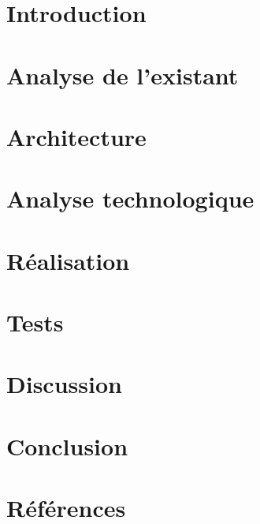 \documentclass[a4paper, 12pt]{article}
\begin{document}
\section{Introduction} %

\newpage

\section{Analyse de l'existant} %

\newpage

\section{Architecture} %

\newpage

\section{Analyse technologique} %

\newpage

\section{Réalisation} %

\newpage

\section{Tests} %

\newpage

\section{Discussion} %

\newpage

\section{Conclusion} %

\newpage

\section{Références} %


\end{document}

